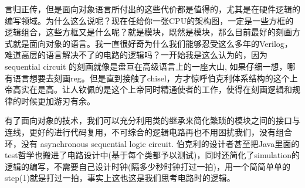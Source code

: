 \documentclass[11pt]{article}
\begin{document}
言归正传，但是面向对象语言所付出的这些代价都是值得的，尤其是在硬件逻辑的编写领域。为什么这么说呢？现在任给你一张CPU的架构图，一定是一些方框的逻辑组合，这些方框又是什么呢？就是模块，既然是模块，那么目前最好的刻画方式就是面向对象的语言。我一直很好奇为什么我们能够忍受这么多年的Verilog，难道高层的语言解决不了的电路的逻辑吗？一开始我是这么认为的，因为sequential circuit 的刻画就像是盘亘在高级语言上的一座大山, 如果仔细一想，哪有语言想要去刻画reg。但是直到接触了chisel，方才惊呼伯克利体系结构的这个上帝高实在是高。让人钦佩的是这个上帝同时精通使者的工作，使得在刻画逻辑和规律的时候更加游刃有余。

有了面向对象的技术，我们可以充分利用类的继承来简化繁琐的模块之间的接口与连线，更好的进行代码复用，不可综合的逻辑电路再也不用困扰我们，没有组合环，没有 asynchronous sequential logic circuit. 伯克利的设计者甚至把Java里面的test哲学也搬进了电路设计中(基于每个类都予以测试)，同时还简化了simulation的逻辑的编写，不需要自己设计时钟(隔多少秒时钟打过一拍)，用一个简简单单的step(1)就是打过一拍，事实上这也这是我们思考电路时的逻辑。
\def\St{\State}
\DeclarePairedDelimiter\ceil{\lceil}{\rceil}
\DeclarePairedDelimiter\floor{\lfloor}{\rfloor}
\end{document}
